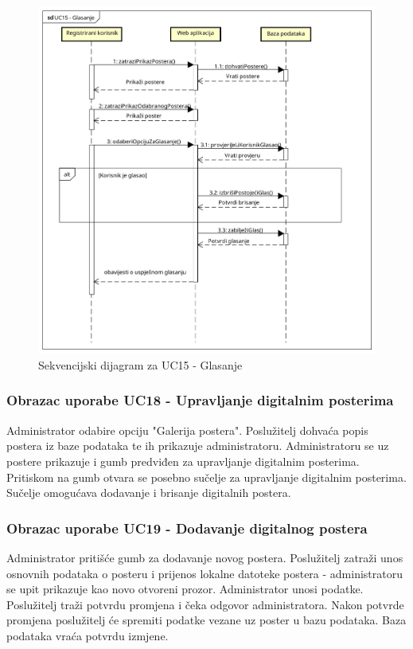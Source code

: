 				\begin{figure}[hp!]
				\includegraphics[width=\linewidth]{Slike/SD_Glasanje.png}
				\caption{Sekvencijski dijagram za UC15 - Glasanje}
				\end{figure}
				
				\newpage
				
				\subsubsection{Obrazac uporabe UC18 - Upravljanje digitalnim posterima}
				Administrator odabire opciju "Galerija postera". Poslužitelj dohvaća popis postera iz baze podataka te ih prikazuje administratoru. Administratoru se uz postere prikazuje i gumb predviđen za upravljanje digitalnim posterima. Pritiskom na gumb otvara se posebno sučelje za upravljanje digitalnim posterima. Sučelje omogućava dodavanje i brisanje digitalnih postera.
				
				\subsubsection{Obrazac uporabe UC19 - Dodavanje digitalnog postera}
				Administrator pritišće gumb za dodavanje novog postera. Poslužitelj zatraži unos osnovnih podataka o posteru i  prijenos lokalne datoteke postera - administratoru se upit prikazuje kao novo otvoreni prozor. Administrator unosi podatke. Poslužitelj traži potvrdu promjena i čeka odgovor administratora. Nakon potvrde promjena poslužitelj će spremiti podatke vezane uz poster u bazu podataka. Baza podataka vraća potvrdu izmjene.
				
